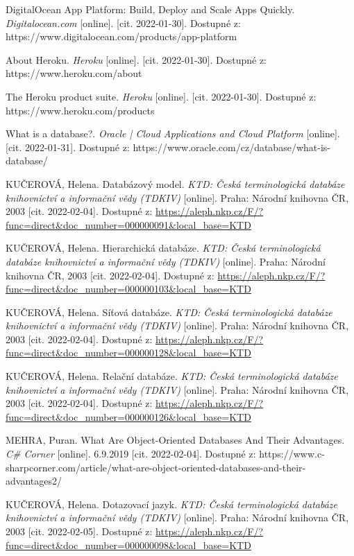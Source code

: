 \begin{thebibliography}{50}
DigitalOcean App Platform: Build, Deploy and Scale Apps Quickly. \textit{Digitalocean.com} [online]. [cit. 2022-01-30]. Dostupné z: https://www.digitalocean.com/products/app-platform

About Heroku. \textit{Heroku} [online]. [cit. 2022-01-30]. Dostupné z: https://www.heroku.com/about

The Heroku product suite. \textit{Heroku} [online]. [cit. 2022-01-30]. Dostupné z: https://www.heroku.com/products

What is a database?. \textit{Oracle | Cloud Applications and Cloud Platform} [online]. [cit. 2022-01-31]. Dostupné z: https://www.oracle.com/cz/database/what-is-database/

KUČEROVÁ, Helena. Databázový model. \textit{KTD: Česká terminologická databáze knihovnictví a informační vědy (TDKIV)} [online]. Praha: Národní knihovna ČR, 2003 [cit. 2022-02-04]. Dostupné z: \url{https://aleph.nkp.cz/F/?func=direct&doc\_number=000000091&local\_base=KTD}

KUČEROVÁ, Helena. Hierarchická databáze. \textit{KTD: Česká terminologická databáze knihovnictví a informační vědy (TDKIV)} [online]. Praha: Národní knihovna ČR, 2003 [cit. 2022-02-04]. Dostupné z: \url{https://aleph.nkp.cz/F/?func=direct&doc\_number=000000103&local\_base=KTD}

KUČEROVÁ, Helena. Síťová databáze. \textit{KTD: Česká terminologická databáze knihovnictví a informační vědy (TDKIV)} [online]. Praha: Národní knihovna ČR, 2003 [cit. 2022-02-04]. Dostupné z: \url{https://aleph.nkp.cz/F/?func=direct&doc\_number=000000128&local\_base=KTD}

KUČEROVÁ, Helena. Relační databáze. \textit{KTD: Česká terminologická databáze knihovnictví a informační vědy (TDKIV)} [online]. Praha: Národní knihovna ČR, 2003 [cit. 2022-02-04]. Dostupné z: \url{https://aleph.nkp.cz/F/?func=direct&doc\_number=000000126&local\_base=KTD}

MEHRA, Puran. What Are Object-Oriented Databases And Their Advantages. \textit{C\# Corner} [online]. 6.9.2019 [cit. 2022-02-04]. Dostupné z: https://www.c-sharpcorner.com/article/what-are-object-oriented-databases-and-their-advantages2/

KUČEROVÁ, Helena. Dotazovací jazyk. \textit{KTD: Česká terminologická databáze knihovnictví a informační vědy (TDKIV)} [online]. Praha: Národní knihovna ČR, 2003 [cit. 2022-02-05]. Dostupné z: \url{https://aleph.nkp.cz/F/?func=direct&doc\_number=000000098&local\_base=KTD}


\end{thebibliography}
